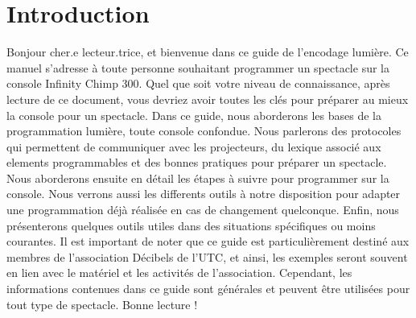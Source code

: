\chapter{Introduction}
\label{chap:introduction}

Bonjour cher.e lecteur.trice, et bienvenue dans ce guide de l'encodage lumière.
Ce manuel s'adresse à toute personne souhaitant programmer un spectacle sur la console Infinity Chimp 300.
Quel que soit votre niveau de connaissance, après lecture de ce document, vous devriez avoir toutes les clés pour préparer au mieux la console pour un spectacle.
\newline
\newline
Dans ce guide, nous aborderons les bases de la programmation lumière, toute console confondue.
Nous parlerons des protocoles qui permettent de communiquer avec les projecteurs, du lexique associé aux elements programmables et des bonnes pratiques pour préparer un spectacle.
\newline
Nous aborderons ensuite en détail les étapes à suivre pour programmer sur la console.
\newline
Nous verrons aussi les differents outils à notre disposition pour adapter une programmation déjà réalisée en cas de changement quelconque.
\newline
Enfin, nous présenterons quelques outils utiles dans des situations spécifiques ou moins courantes.
\newline
\newline
Il est important de noter que ce guide est particulièrement destiné aux membres de l'association Décibels de l'UTC,
et ainsi, les exemples seront souvent en lien avec le matériel et les activités de l'association.
Cependant, les informations contenues dans ce guide sont générales et peuvent être utilisées pour tout type de spectacle.
\newline
\newline
Bonne lecture !
